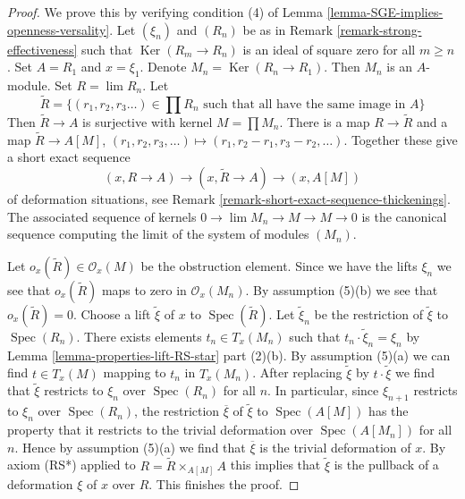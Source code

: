 \documentclass{stacks-project}
\theoremstyle{plain}
\theoremstyle{definition}
\theoremstyle{remark}
\numberwithin{equation}{subsection}
\def\lim{\mathop{\mathrm{lim}}\nolimits}
\def\Spec{\mathop{\mathrm{Spec}}}
\def\Ker{\mathop{\mathrm{Ker}}}
\begin{document}
\begin{proof}
We prove this by verifying condition (4) of
Lemma \ref{lemma-SGE-implies-openness-versality}.
Let $(\xi_n)$ and $(R_n)$ be as in Remark \ref{remark-strong-effectiveness}
such that $\Ker(R_m \to R_n)$ is an ideal of square zero
for all $m \geq n$. Set $A = R_1$ and $x = \xi_1$.
Denote $M_n = \Ker(R_n \to R_1)$.
Then $M_n$ is an $A$-module. Set $R = \lim R_n$.
Let
$$
\tilde R = \{(r_1, r_2, r_3 \ldots) \in \prod R_n
\text{ such that all have the same image in }A\}
$$
Then $\tilde R \to A$ is surjective with kernel $M = \prod M_n$.
There is a map $R \to \tilde R$ and a map
$\tilde R \to A[M]$, $(r_1, r_2, r_3, \ldots) \mapsto
(r_1, r_2 - r_1, r_3 - r_2, \ldots)$.
Together these give a short exact sequence
$$
(x, R \to A) \to (x, \tilde R \to A) \to (x, A[M])
$$
of deformation situations, see
Remark \ref{remark-short-exact-sequence-thickenings}.
The associated sequence of kernels
$0 \to \lim M_n \to M \to M \to 0$
is the canonical sequence computing the limit
of the system of modules $(M_n)$.

\medskip\noindent
Let $o_x(\tilde R) \in \mathcal{O}_x(M)$ be the obstruction element.
Since we have the lifts $\xi_n$ we see that $o_x(\tilde R)$
maps to zero in $\mathcal{O}_x(M_n)$. By assumption (5)(b)
we see that $o_x(\tilde R) = 0$. Choose a lift $\tilde \xi$
of $x$ to $\Spec(\tilde R)$. Let $\tilde \xi_n$ be the
restriction of $\tilde \xi$ to $\Spec(R_n)$. There exists
elements $t_n \in T_x(M_n)$ such that
$t_n \cdot \tilde \xi_n = \xi_n$ by
Lemma \ref{lemma-properties-lift-RS-star} part (2)(b).
By assumption (5)(a) we can find $t \in T_x(M)$
mapping to $t_n$ in $T_x(M_n)$. After replacing
$\tilde \xi$ by $t \cdot \tilde \xi$ we find that
$\tilde \xi$ restricts to $\xi_n$ over $\Spec(R_n)$ for all $n$.
In particular, since $\xi_{n + 1}$ restricts to $\xi_n$
over $\Spec(R_n)$, the restriction $\overline{\xi}$ of $\tilde \xi$
to $\Spec(A[M])$ has the property that it restricts to
the trivial deformation over $\Spec(A[M_n])$ for all $n$.
Hence by assumption (5)(a) we find that $\overline{\xi}$
is the trivial deformation of $x$. By axiom (RS*)
applied to $R = \tilde R \times_{A[M]} A$
this implies that $\tilde \xi$ is the pullback
of a deformation $\xi$ of $x$ over $R$. This finishes the proof.
\end{proof}
\end{document}
